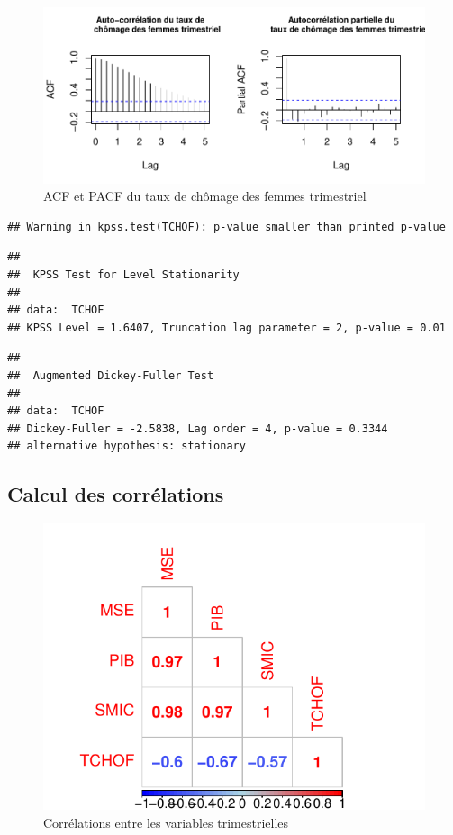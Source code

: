 \documentclass[11pt,]{article}
\begin{document}
\begin{figure}[htbp]
\centering
\includegraphics{doc_files/figure-latex/unnamed-chunk-8-1.pdf}
\caption{\label{fig8} ACF et PACF du taux de chômage des femmes
trimestriel}
\end{figure}

\begin{verbatim}
## Warning in kpss.test(TCHOF): p-value smaller than printed p-value
\end{verbatim}

\begin{verbatim}
## 
##  KPSS Test for Level Stationarity
## 
## data:  TCHOF
## KPSS Level = 1.6407, Truncation lag parameter = 2, p-value = 0.01
\end{verbatim}

\begin{verbatim}
## 
##  Augmented Dickey-Fuller Test
## 
## data:  TCHOF
## Dickey-Fuller = -2.5838, Lag order = 4, p-value = 0.3344
## alternative hypothesis: stationary
\end{verbatim}

\subsection{Calcul des corrélations}\label{calcul-des-correlations}

\begin{figure}[htbp]
\centering
\includegraphics{doc_files/figure-latex/unnamed-chunk-9-1.pdf}
\caption{\label{fig9} Corrélations entre les variables trimestrielles}
\end{figure}
\end{document}
